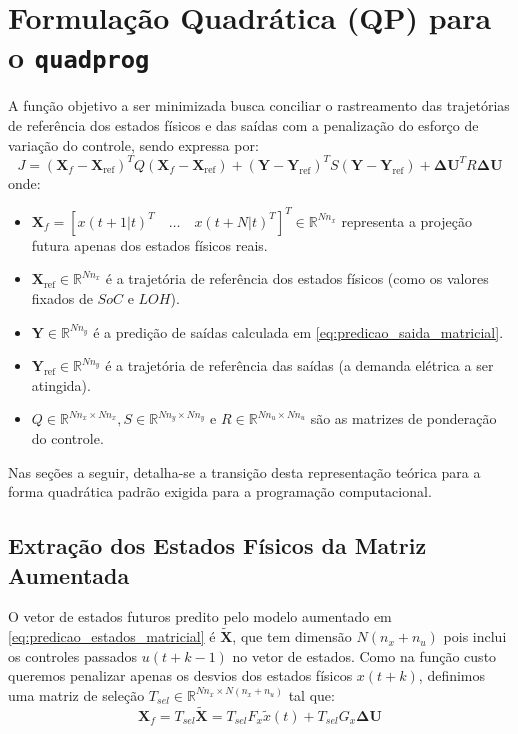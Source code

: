 \documentclass[12pt]{article}
\begin{document}
\section{Formulação Quadrática (QP) para o \texttt{quadprog}}

A função objetivo a ser minimizada busca conciliar o rastreamento das trajetórias de referência dos estados físicos e das saídas com a penalização do esforço de variação do controle, sendo expressa por:
\begin{equation}
\label{eq:custo_original}
J = (\bm{X}_f - \bm{X}_{\text{ref}})^T Q (\bm{X}_f - \bm{X}_{\text{ref}}) + (\bm{Y} - \bm{Y}_{\text{ref}})^T S (\bm{Y} - \bm{Y}_{\text{ref}}) + \bm{\Delta U}^T R \bm{\Delta U}
\end{equation}
onde:
\begin{itemize}
    \item $\bm{X}_f = [x(t+1|t)^T \quad \dots \quad x(t+N|t)^T]^T \in \mathbb{R}^{N n_x}$ representa a projeção futura apenas dos estados físicos reais.
    \item $\bm{X}_{\text{ref}} \in \mathbb{R}^{N n_x}$ é a trajetória de referência dos estados físicos (como os valores fixados de $SoC$ e $LOH$).
    \item $\bm{Y} \in \mathbb{R}^{N n_y}$ é a predição de saídas calculada em \eqref{eq:predicao_saida_matricial}.
    \item $\bm{Y}_{\text{ref}} \in \mathbb{R}^{N n_y}$ é a trajetória de referência das saídas (a demanda elétrica a ser atingida).
    \item $Q \in \mathbb{R}^{N n_x \times N n_x}, S \in \mathbb{R}^{N n_y \times N n_y}$ e $R \in \mathbb{R}^{N n_u \times N n_u}$ são as matrizes de ponderação do controle.
\end{itemize}

Nas seções a seguir, detalha-se a transição desta representação teórica para a forma quadrática padrão exigida para a programação computacional.

\subsection{Extração dos Estados Físicos da Matriz Aumentada}
\label{subsec:extracao}
O vetor de estados futuros predito pelo modelo aumentado em \eqref{eq:predicao_estados_matricial} é $\bm{\tilde{X}}$, que tem dimensão $N(n_x+n_u)$ pois inclui os controles passados $u(t+k-1)$ no vetor de estados. Como na função custo queremos penalizar apenas os desvios dos estados físicos $x(t+k)$, definimos uma matriz de seleção $T_{sel} \in \mathbb{R}^{N n_x \times N(n_x+n_u)}$ tal que:
\begin{equation}
\bm{X}_f = T_{sel} \bm{\tilde{X}} = T_{sel} F_x \tilde{x}(t) + T_{sel} G_x \bm{\Delta U}
\end{equation}
\end{document}
